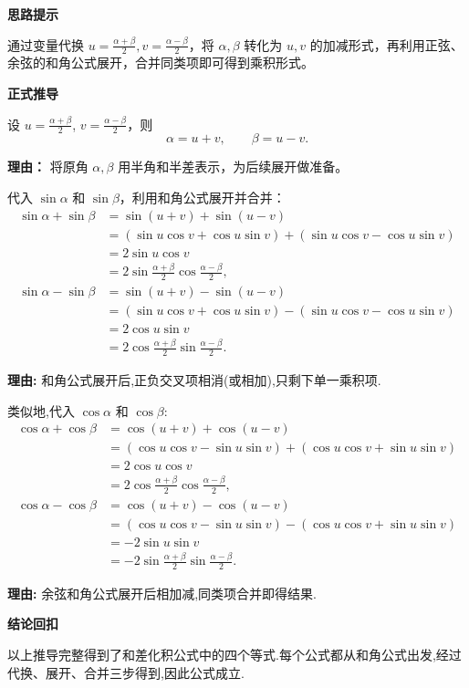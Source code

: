 \begin{proofbox}
	\textbf{\textcolor{CProof}{思路提示}}

	通过变量代换 $u=\frac{\alpha+\beta}{2}, v=\frac{\alpha-\beta}{2}$，将 $\alpha,\beta$ 转化为 $u,v$ 的加减形式，再利用正弦、余弦的和角公式展开，合并同类项即可得到乘积形式。

	\medskip
	\textbf{\textcolor{CProof}{正式推导}}
	\begin{description}[style=nextline, leftmargin=2.8em, labelsep=0.5em, itemsep=0.55em]
		\item[\textbf{步骤一（变量代换）：}]
			设 $u=\frac{\alpha+\beta}{2}$, $v=\frac{\alpha-\beta}{2}$，则
			\[
				\alpha = u+v,
				\qquad
				\beta = u-v.
			\]
			\par\textbf{理由：} 将原角 $\alpha,\beta$ 用半角和半差表示，为后续展开做准备。

		\item[\textbf{步骤二（正弦和差推导）：}]
			代入 $\sin\alpha$ 和 $\sin\beta$，利用和角公式展开并合并：
			\[
				\begin{aligned}
					\sin\alpha+\sin\beta &= \sin(u+v)+\sin(u-v) \\
					&= ( \sin u\cos v+\cos u\sin v) + (\sin u\cos v-\cos u\sin v) \\
					&= 2\sin u\cos v \\
					&= 2\sin\frac{\alpha+\beta}{2}\cos\frac{\alpha-\beta}{2}, \\[4pt]
					\sin\alpha-\sin\beta &= \sin(u+v)-\sin(u-v) \\
					&= ( \sin u\cos v+\cos u\sin v) - (\sin u\cos v-\cos u\sin v) \\
					&= 2\cos u\sin v \\
					&= 2\cos\frac{\alpha+\beta}{2}\sin\frac{\alpha-\beta}{2}.
			\end{aligned}
			\]
			\par\textbf{理由:} 和角公式展开后,正负交叉项相消(或相加),只剩下单一乘积项.

		\item[\textbf{步骤三(余弦和差推导):}]
			类似地,代入 $\cos\alpha$ 和 $\cos\beta$:
			\[
				\begin{aligned}
					\cos\alpha+\cos\beta &= \cos(u+v)+\cos(u-v) \\
					&= ( \cos u\cos v-\sin u\sin v) + (\cos u\cos v+\sin u\sin v) \\
					&= 2\cos u\cos v \\
					&= 2\cos\frac{\alpha+\beta}{2}\cos\frac{\alpha-\beta}{2}, \\[4pt]
					\cos\alpha-\cos\beta &= \cos(u+v)-\cos(u-v) \\
					&= ( \cos u\cos v-\sin u\sin v) - (\cos u\cos v+\sin u\sin v) \\
					&= -2\sin u\sin v \\
					&= -2\sin\frac{\alpha+\beta}{2}\sin\frac{\alpha-\beta}{2}.
			\end{aligned}
			\]
			\par\textbf{理由:} 余弦和角公式展开后相加减,同类项合并即得结果.
	\end{description}

	\medskip
	\textbf{\textcolor{CProof}{结论回扣}}

	以上推导完整得到了和差化积公式中的四个等式.每个公式都从和角公式出发,经过代换、展开、合并三步得到,因此公式成立.
\end{proofbox}
